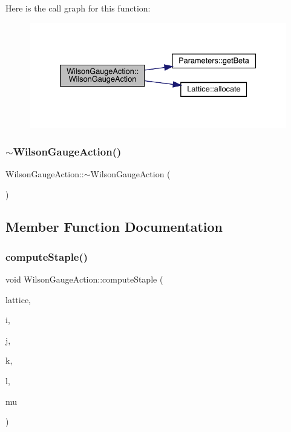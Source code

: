 Here is the call graph for this function\+:
\nopagebreak
\begin{figure}[H]
\begin{center}
\leavevmode
\includegraphics[width=333pt]{class_wilson_gauge_action_a50d06446cf93f7e738e88c372920f518_cgraph}
\end{center}
\end{figure}
\mbox{\label{class_wilson_gauge_action_a0995cd407b76b4f5d035659718591c11}} 
\subsubsection{\texorpdfstring{$\sim$WilsonGaugeAction()}{~WilsonGaugeAction()}}
{\footnotesize\ttfamily Wilson\+Gauge\+Action\+::$\sim$\+Wilson\+Gauge\+Action (\begin{DoxyParamCaption}{ }\end{DoxyParamCaption})}



\subsection{Member Function Documentation}
\mbox{\label{class_wilson_gauge_action_af1f6ba42fcc2b923dc3b37bf150bfae9}} 
\subsubsection{\texorpdfstring{computeStaple()}{computeStaple()}}
{\footnotesize\ttfamily void Wilson\+Gauge\+Action\+::compute\+Staple (\begin{DoxyParamCaption}\item[{\mbox{\hyperlink{class_lattice}{Lattice}}$<$ \mbox{\hyperlink{class_s_u3}{S\+U3}} $>$ $\ast$}]{lattice,  }\item[{unsigned int}]{i,  }\item[{unsigned int}]{j,  }\item[{unsigned int}]{k,  }\item[{unsigned int}]{l,  }\item[{int}]{mu }\end{DoxyParamCaption})\hspace{0.3cm}{\ttfamily [virtual]}}




